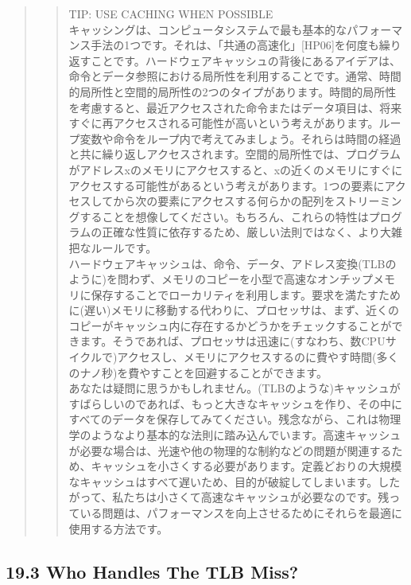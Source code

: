 \begin{quote}
\begin{quote}
TIP: USE CACHING WHEN POSSIBLE\\
キャッシングは、コンピュータシステムで最も基本的なパフォーマンス手法の1つです。それは、「共通の高速化」{[}HP06{]}を何度も繰り返すことです。ハードウェアキャッシュの背後にあるアイデアは、命令とデータ参照における局所性を利用することです。通常、時間的局所性と空間的局所性の2つのタイプがあります。時間的局所性を考慮すると、最近アクセスされた命令またはデータ項目は、将来すぐに再アクセスされる可能性が高いという考えがあります。ループ変数や命令をループ内で考えてみましょう。それらは時間の経過と共に繰り返しアクセスされます。空間的局所性では、プログラムがアドレスxのメモリにアクセスすると、xの近くのメモリにすぐにアクセスする可能性があるという考えがあります。1つの要素にアクセスしてから次の要素にアクセスする何らかの配列をストリーミングすることを想像してください。もちろん、これらの特性はプログラムの正確な性質に依存するため、厳しい法則ではなく、より大雑把なルールです。\\
ハードウェアキャッシュは、命令、データ、アドレス変換(TLBのように)を問わず、メモリのコピーを小型で高速なオンチップメモリ\hspace{0pt}\hspace{0pt}に保存することでローカリティを利用します。要求を満たすために(遅い)メモリに移動する代わりに、プロセッサは、まず、近くのコピーがキャッシュ内に存在するかどうかをチェックすることができます。そうであれば、プロセッサは迅速に(すなわち、数CPUサイクルで)アクセスし、メモリにアクセスするのに費やす時間(多くのナノ秒)を費やすことを回避することができます。\\
あなたは疑問に思うかもしれません。(TLBのような)キャッシュがすばらしいのであれば、もっと大きなキャッシュを作り、その中にすべてのデータを保存してみてください。残念ながら、これは物理学のようなより基本的な法則に踏み込んでいます。高速キャッシュが必要な場合は、光速や他の物理的な制約などの問題が関連するため、キャッシュを小さくする必要があります。定義どおりの大規模なキャッシュはすべて遅いため、目的が破綻してしまいます。したがって、私たちは小さくて高速なキャッシュが必要なのです。残っている問題は、パフォーマンスを向上させるためにそれらを最適に使用する方法です。
\end{quote}
\end{quote}

\hypertarget{who-handles-the-tlb-miss}{%
\subsection*{19.3 Who Handles The TLB
Miss?}\label{who-handles-the-tlb-miss}}

